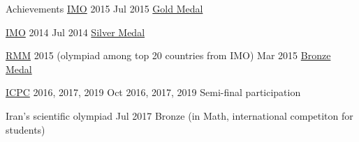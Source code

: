 \begin{honors}{Achievements}
  \setlength{\itemindent}{-1.5em}
  \honor
  {\href{https://www.imo-official.org/}{IMO} 2015}
  {Jul 2015}
  {\href{https://www.imo-official.org/participant_r.aspx?id=25121}{Gold Medal}}

  \honor
  {\href{https://www.imo-official.org/}{IMO} 2014}
  {Jul 2014}
  {\href{https://www.imo-official.org/participant_r.aspx?id=25121}{Silver Medal}}

  \honor
  {
  \href{https://en.wikipedia.org/wiki/Romanian_Master_of_Mathematics_and_Sciences}{RMM} 2015
  (olympiad among top 20 countries from IMO)
  }
  {Mar 2015}
  {\href{http://rmms.lbi.ro/rmm2015/index.php?id=results_math}{Bronze Medal}}

  \honor
  {\href{https://icpc.global/}{ICPC} 2016, 2017, 2019}
  {Oct 2016, 2017, 2019}
  {Semi-final participation}

  \honor
  {Iran's scientific olympiad}
  {Jul 2017}
  {Bronze (in Math, international competiton for students)}



\end{honors}
